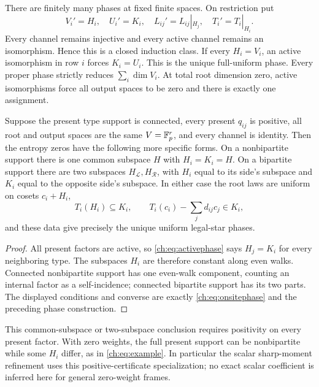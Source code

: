 There are finitely many phases at fixed finite spaces. On restriction put
\begin{equation}\label{ch:eq:restriction}
 V_i'=H_i,\quad U_i'=K_i,\quad L_{ij}'=L_{ij}|_{H_j},\quad T_i'=T_i|_{H_i}.
\end{equation}
Every channel remains injective and every active channel remains an isomorphism. Hence this is a closed induction class. If every $H_i=V_i$, an active isomorphism in row $i$ forces $K_i=U_i$. This is the unique full-uniform phase. Every proper phase strictly reduces $\sum_i\dim V_i$. At total root dimension zero, active isomorphisms force all output spaces to be zero and there is exactly one assignment.

\begin{corollary}\label{ch:cor:positive-phases}
Suppose the present type support is connected, every present
$q_{ij}$ is positive, all root and output spaces are the same
$V=\mathbb F_p^r$, and every channel is identity. Then the entropy zeros
have the following more specific forms.
On a nonbipartite support there is one common subspace $H$ with
$H_i=K_i=H$. On a bipartite support there are two subspaces
$H_{\mathcal L},H_{\mathcal R}$, with $H_i$ equal to its side's
subspace and $K_i$ equal to the opposite side's subspace.
In either case the root laws are uniform on cosets $c_i+H_i$,
\[
 T_i(H_i)\subseteq K_i,\qquad
 T_i(c_i)-\sum_jd_{ij}c_j\in K_i,
\]
and these data give precisely the unique uniform legal-star phases.
\end{corollary}
\begin{proof}
All present factors are active, so \eqref{ch:eq:activephase} says
$H_j=K_i$ for every neighboring type. The subspaces $H_i$ are
therefore constant along even walks. Connected nonbipartite support
has one even-walk component, counting an internal factor as a
self-incidence; connected bipartite support has its two parts.
The displayed conditions and converse are exactly
\eqref{ch:eq:onsitephase} and the preceding phase construction.
\end{proof}

This common-subspace or two-subspace conclusion requires positivity
on every present factor. With zero weights, the full present support
can be nonbipartite while some $H_i$ differ, as in
\eqref{ch:eq:example}. In particular the scalar sharp-moment
refinement uses this positive-certificate specialization; no exact
scalar coefficient is inferred here for general zero-weight frames.

